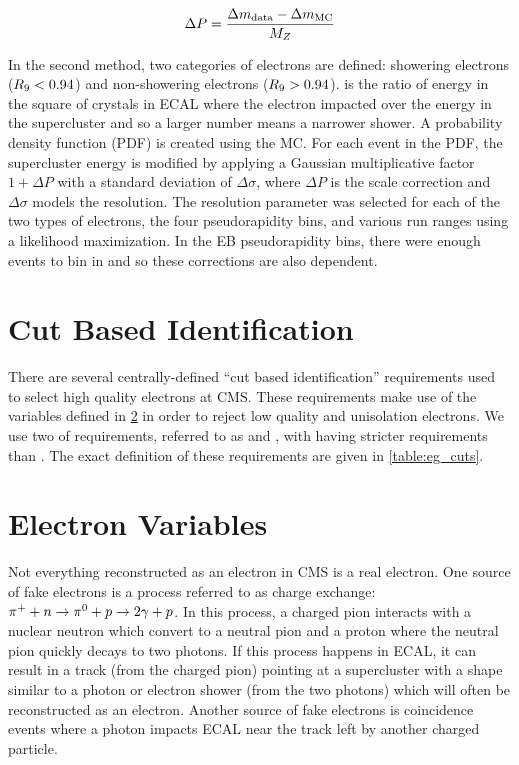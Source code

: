 \begin{equation} \label{eq:scale_correction}
    \Delta P = \frac{\Delta m_{\text{data}} - \Delta m_{\text{MC}}}{M_{Z}}
\end{equation}

In the second method, two categories of electrons are defined: showering
electrons ($R_{9} < 0.94$) and non-showering electrons ($R_{9} > 0.94$).
\RNine is the ratio of energy in the \threebythree square of crystals in ECAL
where the electron impacted over the energy in the supercluster and so a larger
number means a narrower shower. A probability density function (PDF) is created
using the \Ztoee MC. For each event in the PDF, the supercluster energy is
modified by applying a Gaussian multiplicative factor $1+\Delta P$ with a
standard deviation of $\Delta \sigma$, where $\Delta P$ is the scale correction
and $\Delta \sigma$ models the resolution. The resolution parameter was
selected for each of the two types of electrons, the four pseudorapidity bins,
and various run ranges using a likelihood maximization. In the EB
pseudorapidity bins, there were enough events to bin in \ET and so these
corrections are also \ET dependent.

\section{Cut Based Identification}
\label{sec:cut_based_id}

There are several centrally-defined ``cut based identification'' requirements
used to select high quality electrons at CMS. These requirements make use of
the variables defined in \cref{sec:electron_variables} in order to
reject low quality and unisolation electrons. We use two of requirements,
referred to as \EGMEDIUM and \EGTIGHT, with \EGTIGHT having stricter
requirements than \EGMEDIUM. The exact definition of these requirements are
given in
\cref{table:eg_cuts}.



\section{Electron Variables}
\label{sec:electron_variables}

Not everything reconstructed as an electron in CMS is a real electron. One
source of fake electrons is a process referred to as charge exchange:
$\pi^{+} + n \to \pi^{0} + p \to 2 \gamma + p$. In this process, a charged pion
interacts with a nuclear neutron which convert to a neutral pion and a proton
where the neutral pion quickly decays to two photons. If this process happens
in ECAL, it can result in a track (from the charged
pion) pointing at a supercluster with a shape similar to a photon or electron
shower (from the two photons) which will often be reconstructed as an electron.
Another source of fake electrons is coincidence events where a photon impacts
ECAL near the track left by another charged particle.


